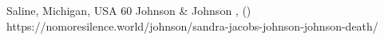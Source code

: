           {Saline, Michigan, USA}
          {60}
          {Johnson \& Johnson}
          {}
          {
            ,
             ()
          }
          {https://nomoresilence.world/johnson/sandra-jacobs-johnson-johnson-death/}
